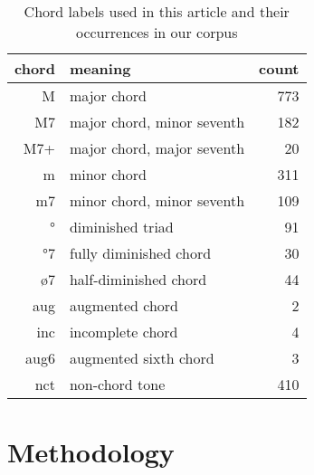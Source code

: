 \documentclass{article}
\begin{document}
\begin{table}
\centering
\begin{tabular}{r|l|r}
chord & meaning                   & count\\ \hline
    M & major chord               & 773 \\
   M7 & major chord, minor seventh& 182 \\
  M7+ & major chord, major seventh& 20 \\
    m & minor chord               & 311 \\
   m7 & minor chord, minor seventh& 109 \\
    ° & diminished triad          & 91 \\
   °7 & fully diminished chord    & 30 \\
   ø7 & half-diminished chord     & 44  \\
  aug & augmented chord           & 2   \\
  inc & incomplete chord          & 4   \\
 aug6 & augmented sixth chord     & 3   \\
  nct & non-chord tone            & 410 \\
\end{tabular}
\caption{Chord labels used in this article and their occurrences in our
corpus}
\label{tab:legenda}
\end{table}

\section{Methodology}
\label{sec:methodology}
\end{document}
